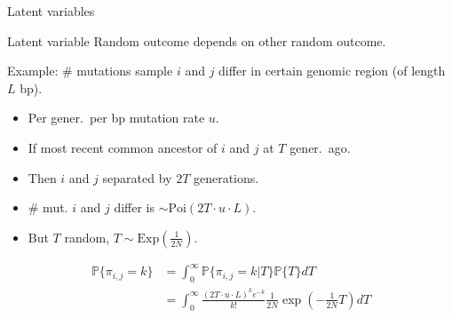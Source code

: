 \documentclass{beamer}
\renewcommand{\P}{\mathbb{P}}
\newcommand{\1}{\ensuremath{\mathbf{1}}}
\begin{document}
\begin{frame}{Latent variables}
    \begin{block}{Latent variable}
        Random outcome depends on other random outcome.
    \end{block}
    Example: \# mutations sample $i$ and $j$ differ in certain genomic region (of length $L$ bp).
    \begin{itemize}
        \item Per gener.\ per bp mutation rate $u$.
        \item If most recent common ancestor of $i$ and $j$ at $T$ gener.\ ago.
        \item Then $i$ and $j$ separated by $2T$ generations.
        \item \# mut. $i$ and $j$ differ is $\sim \text{Poi}(2T \cdot u \cdot L)$.
        \item But $T$ random, $T \sim \text{Exp}(\tfrac{1}{2N})$. 
    \end{itemize}
    \begin{block}{}
        \begin{equation}
            \begin{split}
                \P\{\pi_{i,j} = k\} & = \int_0^\infty \P\{\pi_{i,j} = k | T\} \P\{T\} dT\\
                    & = \int_0^\infty \tfrac{(2T \cdot u \cdot L)^k e^{-k}}{k!} \tfrac{1}{2N} \exp(-\tfrac{1}{2N}T) dT
            \end{split}
        \end{equation}
    \end{block}
\end{frame}
%
%
%
\end{document}
